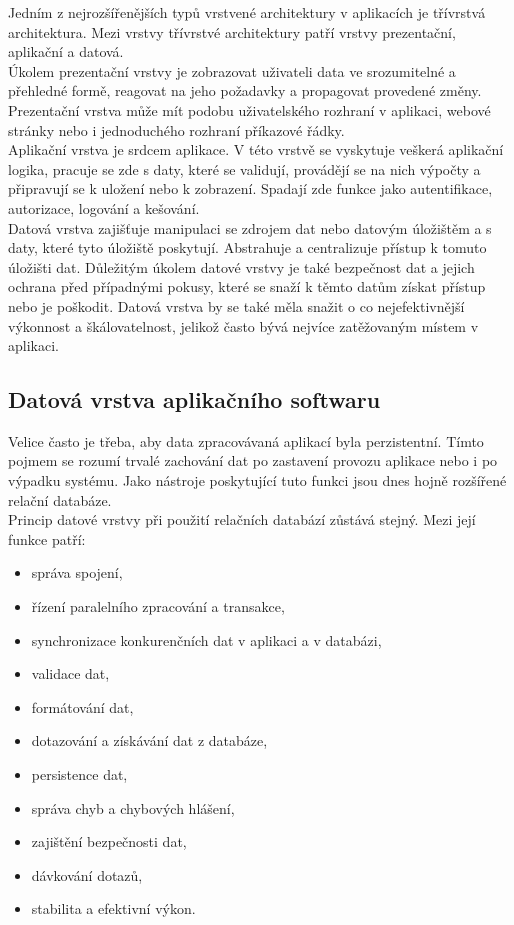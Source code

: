\documentclass[ing,male,java,dept456]{diploma}						%
\begin{document}
Jedním z nejrozšířenějších typů vrstvené architektury v aplikacích je třívrstvá architektura. Mezi vrstvy třívrstvé architektury patří vrstvy prezentační, aplikační a datová. \\
Úkolem prezentační vrstvy je zobrazovat uživateli data ve srozumitelné a přehledné formě, reagovat na jeho požadavky a propagovat provedené změny. Prezentační vrstva může mít podobu uživatelského rozhraní v aplikaci, webové stránky nebo i jednoduchého rozhraní příkazové řádky. \\
Aplikační vrstva je srdcem aplikace. V této vrstvě se vyskytuje veškerá aplikační logika, pracuje se zde s daty, které se validují, provádějí se na nich výpočty a připravují se k uložení nebo k zobrazení. Spadají zde funkce jako autentifikace, autorizace, logování a kešování. \\
Datová vrstva zajišťuje manipulaci se zdrojem dat nebo datovým úložištěm a s daty, které tyto úložiště poskytují. Abstrahuje a centralizuje přístup k tomuto úložišti dat. Důležitým úkolem datové vrstvy je také bezpečnost dat a jejich ochrana před případnými pokusy, které se snaží k těmto datům získat přístup nebo je poškodit. Datová vrstva by se také měla snažit o co nejefektivnější výkonnost a škálovatelnost, jelikož často bývá nejvíce zatěžovaným místem v aplikaci. \\

\subsection{Datová vrstva aplikačního softwaru}
\label{subsec:Data-layer}
Velice často je třeba, aby data zpracovávaná aplikací byla perzistentní. Tímto pojmem se rozumí trvalé zachování dat po zastavení provozu aplikace nebo i po výpadku systému. Jako nástroje poskytující tuto funkci jsou dnes hojně rozšířené relační databáze. \\
Princip datové vrstvy při použití relačních databází zůstává stejný. Mezi její funkce patří:
\begin{itemize}
\item správa spojení,
\item řízení paralelního zpracování a transakce,
\item synchronizace konkurenčních dat v aplikaci a v databázi,
\item validace dat,
\item formátování dat,
\item dotazování a získávání dat z databáze,
\item persistence dat,
\item správa chyb a chybových hlášení,
\item zajištění bezpečnosti dat,
\item dávkování dotazů,
\item stabilita a efektivní výkon.
\end{itemize}
\end{document}
